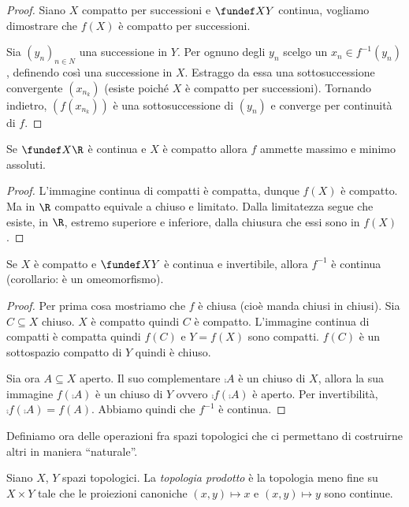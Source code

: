 \begin{proof}
	Siano $X$ compatto per successioni e $\fundef XY$ continua, vogliamo dimostrare che $f(X)$ è compatto per successioni.
	
	Sia $(y_n)_{n\in N}$ una successione in $Y$. Per ognuno degli $y_n$ scelgo un $x_n\in f^{-1}(y_n)$, definendo così una successione in $X$.
	Estraggo da essa una sottosuccessione convergente $(x_{n_k})$ (esiste poiché $X$ è compatto per successioni).
	Tornando indietro, $(f(x_{n_k}))$ è una sottosuccessione di $(y_n)$ e converge per continuità di $f$.
\end{proof}

\begin{lemma}
	Se $\fundef X\R$ è continua e $X$ è compatto allora $f$ ammette massimo e minimo assoluti.
\end{lemma}

\begin{proof}
	L'immagine continua di compatti è compatta, dunque $f(X)$ è compatto. Ma in $\R$ compatto equivale a chiuso e limitato. Dalla limitatezza segue che esiste, in $\R$, estremo superiore e inferiore, dalla chiusura che essi sono in $f(X)$.
\end{proof}

\begin{lemma}
	Se $X$ è compatto e $\fundef XY$ è continua e invertibile, allora $f^{-1}$ è continua (corollario: è un omeomorfismo).
\end{lemma}

\begin{proof}
	Per prima cosa mostriamo che $f$ è chiusa (cioè manda chiusi in chiusi).
	Sia $C\subseteq X$ chiuso.
	$X$ è compatto quindi $C$ è compatto.
	L'immagine continua di compatti è compatta quindi $f(C)$ e $Y=f(X)$ sono compatti.
	$f(C)$ è un sottospazio compatto di $Y$ quindi è chiuso.
	
	Sia ora $A\subseteq X$ aperto.
	Il suo complementare $\comp A$ è un chiuso di $X$, allora la sua immagine $f(\comp A)$ è un chiuso di $Y$ ovvero $\comp{f(\comp A)}$ è aperto.
	Per invertibilità, $\comp{f(\comp A)}=f(A)$.
	Abbiamo quindi che $f^{-1}$ è continua.
\end{proof}


Definiamo ora delle operazioni fra spazi topologici che ci permettano di costruirne altri in maniera ``naturale''.

\begin{defn}
	Siano $X$, $Y$ spazi topologici.
	La \emph{topologia prodotto} è la topologia meno fine su $X\times Y$ tale che le proiezioni canoniche $(x,y)\mapsto x$ e $(x, y)\mapsto y$	sono continue.
\end{defn}

